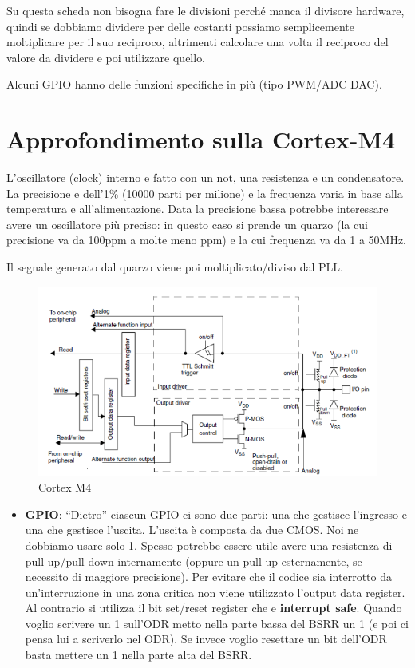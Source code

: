 \documentclass[
]{book}
\providecommand{\tightlist}{%
  \setlength{\itemsep}{0pt}\setlength{\parskip}{0pt}}
\begin{document}
Su questa scheda non bisogna fare le divisioni perché manca il divisore
hardware, quindi se dobbiamo dividere per delle costanti possiamo
semplicemente moltiplicare per il suo reciproco, altrimenti calcolare
una volta il reciproco del valore da dividere e poi utilizzare quello.

Alcuni GPIO hanno delle funzioni specifiche in più (tipo PWM/ADC DAC).

\section{Approfondimento sulla
Cortex-M4}\label{approfondimento-sulla-cortex-m4}

L'oscillatore (clock) interno e fatto con un not, una resistenza e un
condensatore. La precisione e dell'1\% (10000 parti per milione) e la
frequenza varia in base alla temperatura e all'alimentazione. Data la
precisione bassa potrebbe interessare avere un oscillatore più preciso:
in questo caso si prende un quarzo (la cui precisione va da 100ppm a
molte meno ppm) e la cui frequenza va da 1 a 50MHz.

Il segnale generato dal quarzo viene poi moltiplicato/diviso dal PLL.

\begin{figure}
\centering
\includegraphics[width=0.5\linewidth,height=\textheight,keepaspectratio]{immagini/50.png}
\caption{Cortex M4}
\end{figure}

\begin{itemize}
\tightlist
\item
  \textbf{GPIO}: ``Dietro'' ciascun GPIO ci sono due parti: una che
  gestisce l'ingresso e una che gestisce l'uscita. \newline L'uscita è
  composta da due CMOS. Noi ne dobbiamo usare solo 1. Spesso potrebbe
  essere utile avere una resistenza di pull up/pull down internamente
  (oppure un pull up esternamente, se necessito di maggiore precisione).
  Per evitare che il codice sia interrotto da un'interruzione in una
  zona critica non viene utilizzato l'output data register. \newline Al
  contrario si utilizza il bit set/reset register che e
  \textbf{interrupt safe}. \newline Quando voglio scrivere un 1 sull'ODR
  metto nella parte bassa del BSRR un 1 (e poi ci pensa lui a scriverlo
  nel ODR). Se invece voglio resettare un bit dell'ODR basta mettere un
  1 nella parte alta del BSRR.
\end{itemize}
\end{document}
